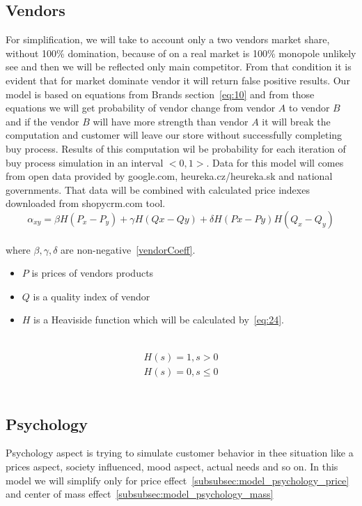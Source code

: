 \subsection{Vendors} \label{subsec:model_vendors}
For simplification, we will take to account only a two vendors market share, without 100\% domination, because of on a real
market is 100\% monopole unlikely see and then we will be reflected only main competitor.
From that condition it is evident that for market dominate vendor it will return false positive results.
Our model is based on equations from Brands section~\ref{eq:10} and from those equations we will get probability of vendor change from
vendor $A$ to vendor $B$ and if the vendor $B$ will have more strength than vendor $A$ it will break the computation and customer
will leave our store without successfully completing buy process.
Results of this computation wil be probability for each iteration of buy process simulation in an interval $<0,1>$.
Data for this model will comes from open data provided by google.com, heureka.cz/heureka.sk and national governments.
That data will be combined with calculated price indexes downloaded from shopycrm.com tool.
\\
\begin{equation} \label{eq:24}
\alpha_{xy} = \beta H(P_x-P_y) + \gamma H(Qx-Qy) + \delta H(Px-Py)H(Q_x - Q_y)
\end{equation}
\\
where $\beta, \gamma, \delta$ are non-negative~\ref{vendorCoeff}.
\\
\begin{itemize}
    \item $P$ is prices of vendors products
    \item $Q$ is a quality index of vendor
    \item $H$ is a Heaviside function which will be calculated by~\ref{eq:24}.
\end{itemize}
\\
\begin{eqnarray} \label{eq:25}
H(s) = 1, s > 0 \\
H (s) = 0, s \leq 0
\end{eqnarray}
\\
\subsection{Psychology} \label{subsec:model_psychology}
Psychology aspect is trying to simulate customer behavior in thee situation like a prices aspect, society influenced, mood aspect, actual needs
and so on.
In this model we will simplify only for price effect~\ref{subsubsec:model_psychology_price} and center of mass effect~\ref{subsubsec:model_psychology_mass}
